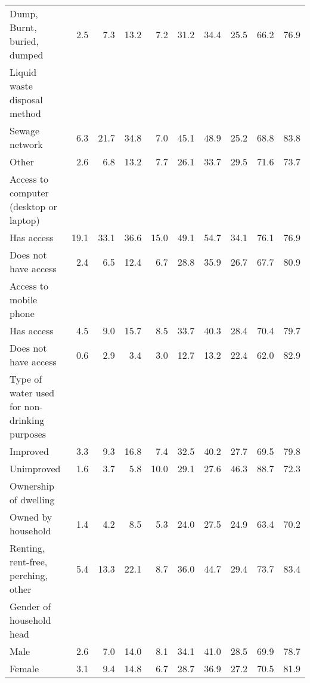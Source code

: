 \begin{tabular}{l r r r r r r r r r}
\hspace{6mm} Dump, Burnt, buried, dumped  &  2.5  &  7.3  &  13.2  &  7.2  &  31.2  &  34.4  &  25.5  &  66.2  &  76.9 \\
Liquid waste disposal method &&&&&&&&&\\
\hspace{6mm} Sewage network  &  6.3  &  21.7  &  34.8  &  7.0  &  45.1  &  48.9  &  25.2  &  68.8  &  83.8 \\
\hspace{6mm} Other  &  2.6  &  6.8  &  13.2  &  7.7  &  26.1  &  33.7  &  29.5  &  71.6  &  73.7 \\
Access to computer (desktop or laptop) &&&&&&&&&\\
\hspace{6mm} Has access  &  19.1  &  33.1  &  36.6  &  15.0  &  49.1  &  54.7  &  34.1  &  76.1  &  76.9 \\
\hspace{6mm} Does not have access  &  2.4  &  6.5  &  12.4  &  6.7  &  28.8  &  35.9  &  26.7  &  67.7  &  80.9 \\
Access to mobile phone &&&&&&&&&\\
\hspace{6mm} Has access  &  4.5  &  9.0  &  15.7  &  8.5  &  33.7  &  40.3  &  28.4  &  70.4  &  79.7 \\
\hspace{6mm} Does not have access  &  0.6  &  2.9  &  3.4  &  3.0  &  12.7  &  13.2  &  22.4  &  62.0  &  82.9 \\
Type of water used for non-drinking purposes &&&&&&&&&\\
\hspace{6mm} Improved  &  3.3  &  9.3  &  16.8  &  7.4  &  32.5  &  40.2  &  27.7  &  69.5  &  79.8 \\
\hspace{6mm} Unimproved  &  1.6  &  3.7  &  5.8  &  10.0  &  29.1  &  27.6  &  46.3  &  88.7  &  72.3 \\
Ownership of dwelling &&&&&&&&&\\
\hspace{6mm} Owned by household  &  1.4  &  4.2  &  8.5  &  5.3  &  24.0  &  27.5  &  24.9  &  63.4  &  70.2 \\
\hspace{6mm} Renting, rent-free, perching, other  &  5.4  &  13.3  &  22.1  &  8.7  &  36.0  &  44.7  &  29.4  &  73.7  &  83.4 \\
Gender of household head &&&&&&&&&\\
\hspace{6mm} Male  &  2.6  &  7.0  &  14.0  &  8.1  &  34.1  &  41.0  &  28.5  &  69.9  &  78.7 \\
\hspace{6mm} Female  &  3.1  &  9.4  &  14.8  &  6.7  &  28.7  &  36.9  &  27.2  &  70.5  &  81.9 \\
\bottomrule
\end{tabular}
